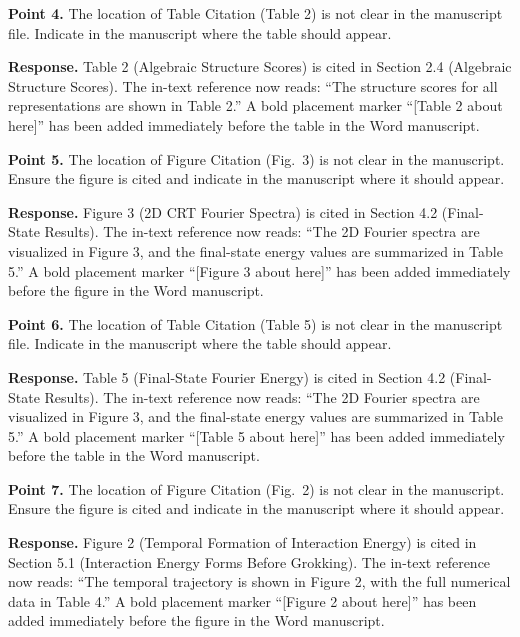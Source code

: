 \documentclass[11pt,a4paper]{article}
\begin{document}
\bigskip

\textbf{Point 4.} The location of Table Citation (Table 2) is not clear in the manuscript file. Indicate in the manuscript where the table should appear.

\textbf{Response.} Table 2 (Algebraic Structure Scores) is cited in Section 2.4 (Algebraic Structure Scores). The in-text reference now reads: ``The structure scores for all representations are shown in Table 2.'' A bold placement marker ``[Table 2 about here]'' has been added immediately before the table in the Word manuscript.

\bigskip

\textbf{Point 5.} The location of Figure Citation (Fig.~3) is not clear in the manuscript. Ensure the figure is cited and indicate in the manuscript where it should appear.

\textbf{Response.} Figure 3 (2D CRT Fourier Spectra) is cited in Section 4.2 (Final-State Results). The in-text reference now reads: ``The 2D Fourier spectra are visualized in Figure 3, and the final-state energy values are summarized in Table 5.'' A bold placement marker ``[Figure 3 about here]'' has been added immediately before the figure in the Word manuscript.

\bigskip

\textbf{Point 6.} The location of Table Citation (Table 5) is not clear in the manuscript file. Indicate in the manuscript where the table should appear.

\textbf{Response.} Table 5 (Final-State Fourier Energy) is cited in Section 4.2 (Final-State Results). The in-text reference now reads: ``The 2D Fourier spectra are visualized in Figure 3, and the final-state energy values are summarized in Table 5.'' A bold placement marker ``[Table 5 about here]'' has been added immediately before the table in the Word manuscript.

\bigskip

\textbf{Point 7.} The location of Figure Citation (Fig.~2) is not clear in the manuscript. Ensure the figure is cited and indicate in the manuscript where it should appear.

\textbf{Response.} Figure 2 (Temporal Formation of Interaction Energy) is cited in Section 5.1 (Interaction Energy Forms Before Grokking). The in-text reference now reads: ``The temporal trajectory is shown in Figure 2, with the full numerical data in Table 4.'' A bold placement marker ``[Figure 2 about here]'' has been added immediately before the figure in the Word manuscript.
\end{document}
